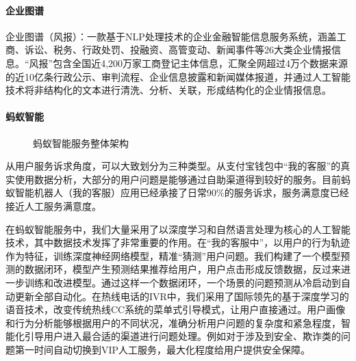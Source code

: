 \documentclass[letterpaper,10pt,english]{sphinxmanual}
\begin{document}
\paragraph{企业图谱}
\label{\detokenize{chapter_AI_company/antgroup:id2}}
企业图谱（风报）：一款基于NLP处理技术的企业金融智能信息服务系统，涵盖工商、诉讼、税务、行政处罚、投融资、高管变动、新闻事件等26大类企业情报信息。“风报”包含全国近4,200万家工商登记主体信息，汇聚全网超过4万个数据来源的近10亿条行政公示、审判流程、企业信息披露和新闻媒体报道，并通过人工智能技术将非结构化的文本进行清洗、分析、关联，形成结构化的企业情报信息。%
\begin{footnote}[988]\sphinxAtStartFootnote
{}
%
\end{footnote}


\paragraph{蚂蚁智能}
\label{\detokenize{chapter_AI_company/antgroup:id3}}
\begin{figure}[H]
\centering
\capstart

\noindent{}
\caption{蚂蚁智能服务整体架构}\label{\detokenize{chapter_AI_company/antgroup:id5}}\end{figure}

从用户服务诉求角度，可以大致划分为三种类型。从支付宝钱包中“我的客服”的真实使用数据分析，大部分的用户问题是能够通过自助渠道得到较好的服务。目前蚂蚁智能机器人（我的客服）应用已经承接了日常90\%的服务诉求，服务满意度已经接近人工服务满意度。

在蚂蚁智能服务中，我们大量采用了以深度学习和自然语言处理为核心的人工智能技术，其中数据技术发挥了非常重要的作用。在“我的客服中”，以用户的行为轨迹作为特征，训练深度神经网络模型，精准“猜测”用户问题。我们构建了一个模型预测的数据闭环，模型产生预测结果推荐给用户，用户点击形成反馈数据，反过来进一步训练和改进模型。通过这样一个数据闭环，一个场景的问题预测从冷启动到自动更新全部自动化。在热线电话的IVR中，我们采用了国际领先的基于深度学习的语音技术，改变传统热线CC系统的菜单式引导模式，让用户直接通过。用户画像和行为分析能够根据用户的不同状况，准确分析用户问题的复杂度和紧急程度，智能化引导用户进入最合适的渠道进行问题处理。例如对于涉及到安全、欺诈类的问题第一时间自动切换到VIP人工服务，最大化程度给用户提供安全保障。
\end{document}
